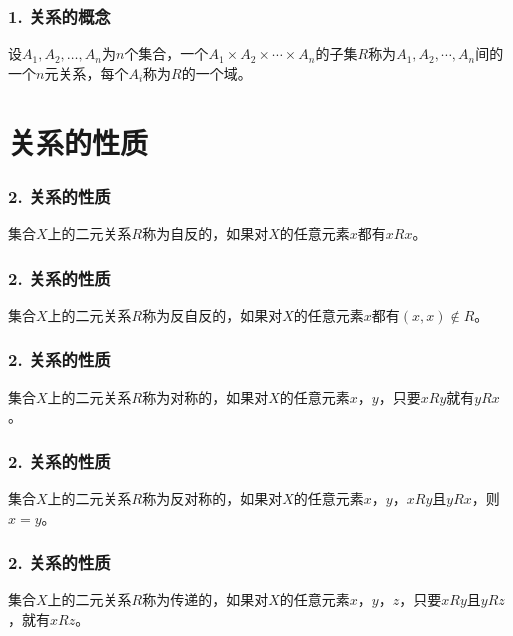 \documentclass{beamer}
\begin{document}
\begin{CJK*}{UTF8}{gbsn}
\begin{frame}
  \frametitle{1. 关系的概念}
  \begin{Def}
    设$A_1, A_2, \ldots, A_n$为$n$个集合，一个$A_1\times A_2 \times \cdots \times A_n$的子集$R$称为$A_1, A_2, \cdots, A_n$间的一个\alert{$n$元关系}，每个$A_i$称为$R$的一个域。
  \end{Def}
\end{frame}
\section{关系的性质}
\begin{frame}
  \frametitle{2. 关系的性质}
  \begin{Def}
    集合$X$上的二元关系$R$称为\alert{自反}的，如果对$X$的任意元素$x$都有$xRx$。
  \end{Def}
\end{frame}

\begin{frame}
  \frametitle{2. 关系的性质}
  \begin{Def}
   集合$X$上的二元关系$R$称为\alert{反自反}的，如果对$X$的任意元素$x$都有$(x,x) \notin R$。
  \end{Def}
\end{frame}
\begin{frame}
  \frametitle{2. 关系的性质}
  \begin{Def}
    集合$X$上的二元关系$R$称为\alert{对称}的，如果对$X$的任意元素$x$，$y$，只要$xRy$就有$yRx$。
  \end{Def}
\end{frame}
\begin{frame}
  \frametitle{2. 关系的性质}
  \begin{Def}
         集合$X$上的二元关系$R$称为\alert{反对称}的，如果对$X$的任意元素$x$，$y$，$xRy$且$yRx$，则$x=y$。    
  \end{Def}
\end{frame}
\begin{frame}
  \frametitle{2. 关系的性质}
  \begin{Def}
        集合$X$上的二元关系$R$称为\alert{传递}的，如果对$X$的任意元素$x$，$y$，$z$，只要$xRy$且$yRz$，就有$xRz$。
  \end{Def}
\end{frame}

\end{CJK*}
\end{document}
